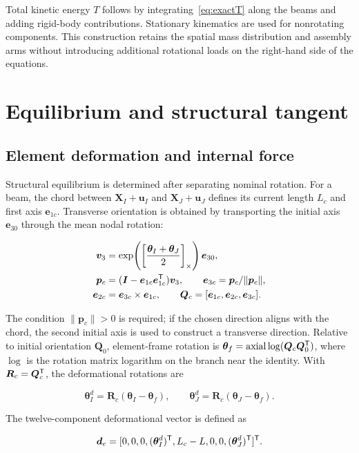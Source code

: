 Total kinetic energy $T$ follows by integrating~\eqref{eq:exactT} along the beams and adding rigid-body contributions. Stationary kinematics are used for nonrotating components. This construction retains the spatial mass distribution and assembly arms without introducing additional rotational loads on the right-hand side of the equations.

\section{Equilibrium and structural tangent}
\subsection{Element deformation and internal force}
Structural equilibrium is determined after separating nominal rotation. For a beam, the chord between $\bm X_I+\bm u_I$ and $\bm X_J+\bm u_J$ defines its current length $L_c$ and first axis $\bm e_{1c}$. Transverse orientation is obtained by transporting the initial axis $\bm e_{30}$ through the mean nodal rotation:

\begin{align}
\bm v_3&=\exp\!\left(\left[\frac{\bm\theta_I+\bm\theta_J}{2}\right]_\times\right)\bm e_{30},\nonumber\\
\bm p_c&=(\bm I-\bm e_{1c}\bm e_{1c}^\mathsf T)\bm v_3,\qquad
\bm e_{3c}=\bm p_c/\|\bm p_c\|,\nonumber\\
\bm e_{2c}&=\bm e_{3c}\times\bm e_{1c},\qquad
\bm Q_c=[\bm e_{1c},\bm e_{2c},\bm e_{3c}].
\end{align}

The condition $\|\bm p_c\|>0$ is required; if the chosen direction aligns with the chord, the second initial axis is used to construct a transverse direction. Relative to initial orientation $\bm Q_0$, element-frame rotation is $\bm\theta_f=\operatorname{axial}\log(\bm Q_c\bm Q_0^\mathsf T)$, where $\log$ is the rotation matrix logarithm on the branch near the identity. With $\bm R_c=\bm Q_c^\mathsf T$, the deformational rotations are

\begin{equation}
\bm\theta_I^d=\bm R_c(\bm\theta_I-\bm\theta_f),\qquad
\bm\theta_J^d=\bm R_c(\bm\theta_J-\bm\theta_f).
\end{equation}

The twelve-component deformational vector is defined as

\begin{equation}
\bm d_e=[0,0,0,(\bm\theta_I^d)^\mathsf T,L_c-L,0,0,
(\bm\theta_J^d)^\mathsf T]^\mathsf T.
\end{equation}

